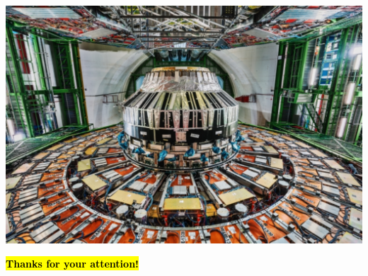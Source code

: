 \documentclass[aspectratio = 1610, xcolor = dvipsnames]{beamer}
\makeatletter
\let\HL\hl
\renewcommand\hl{%
  \let\set@color\beamerorig@set@color
  \let\reset@color\beamerorig@reset@color
  \HL}
\makeatother
\begin{document}
	{\usebackgroundtemplate
    {\includegraphics[width=\paperwidth,height=\paperheight]{images/CMS-wallpaper2.pdf}}
	\begin{frame}
    	\thispagestyle{empty}
    	\vspace{-3.cm}
    	\begin{center}
            {\bf\Huge{\textcolor{unipd}{\hl{Thanks for your attention!}}}}
        \end{center}
	\end{frame}}
	
\end{document}
